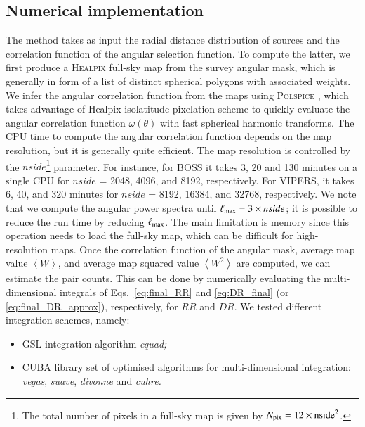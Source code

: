 \documentclass{aa}
\newcommand{\ev}[1]{\left\langle #1 \right\rangle}
\begin{document}
\subsection{Numerical implementation} \label{sec:numerical_implementation}

The method takes as input the radial distance distribution of sources and the correlation function of the angular selection function. To compute the latter, we first produce a \textsc{Healpix} \citep{gorski2005healpix} full-sky map from the survey angular mask, which is generally in form of a list of distinct spherical polygons with associated weights. We infer the angular correlation function from the maps using \textsc{Polspice} \citep{szapudi2001fast, chon2004fast}, which takes advantage of {\sc Healpix} isolatitude pixelation scheme to quickly evaluate the angular correlation function $\omega(\theta)$ with fast spherical harmonic transforms. The CPU time to compute the angular correlation function depends on the map resolution, but it is generally quite efficient. The map resolution is controlled by the $nside$\footnote{The total number of pixels in a full-sky map is given by $N_{\rm pix} = 12\times \rm{nside}^2$.} parameter. For instance, for BOSS it takes 3, 20 and 130 minutes on a single CPU for $nside$ = 2048, 4096, and 8192, respectively. For VIPERS, it takes 6, 40, and 320 minutes for $nside$ = 8192, 16384, and 32768, respectively. We note that we compute the angular power spectra until $\ell_{\rm max} = 3\times nside$;  it is possible to reduce the run time by reducing $\ell_{\rm max}$. The main limitation is memory since this operation needs to load the full-sky map, which can be difficult for high-resolution maps. Once the correlation function of the angular mask, average map value $\ev{W}$, and average map squared value $\ev{W^2}$ are computed, we can estimate the pair counts. This can be done by numerically evaluating  the multi-dimensional integrals of Eqs.~\eqref{eq:final_RR} and \eqref{eq:DR_final} (or \ref{eq:final_DR_approx}), respectively, for $RR$ and $DR$. We tested different integration schemes, namely: 
\begin{itemize}
    \item \textsc{GSL} \citep{gough2009gnu} integration algorithm \emph{cquad;}
    \item \textsc{CUBA} library \citep{hahn2005cuba} set of optimised algorithms for multi-dimensional integration: \emph{vegas}, \emph{suave}, \emph{divonne} and \emph{cuhre.}
\end{itemize}
\end{document}
